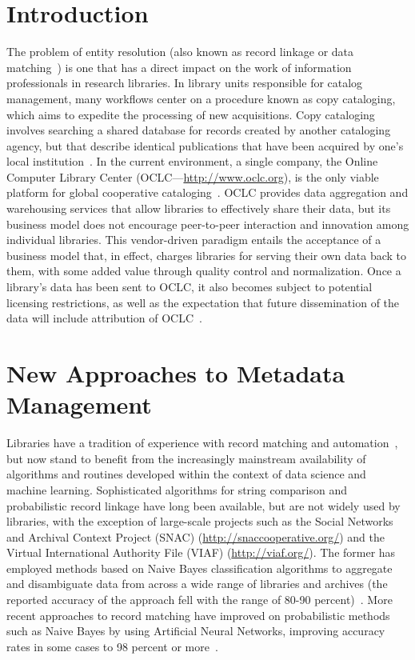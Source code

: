 
\maketitle

\section{Introduction}
The problem of entity resolution (also known as record linkage or data
matching~\cite{pC12}) is one that has a direct impact on the work of
information professionals in research libraries. In library units
responsible for catalog management, many workflows center on a procedure
known as copy cataloging, which aims to expedite the processing of new
acquisitions. Copy cataloging involves searching a shared database for
records created by another cataloging agency, but that describe identical
publications that have been acquired by one's local institution~\cite{cD17}.
In the current environment, a single company, the Online Computer Library
Center (OCLC---\url{http://www.oclc.org}), is the only viable platform for
global cooperative cataloging~\cite{aT10}. OCLC provides data aggregation
and warehousing services that allow libraries to effectively share their
data, but its business model does not encourage peer-to-peer interaction and
innovation among individual libraries. This vendor-driven paradigm entails
the acceptance of a business model that, in effect, charges libraries for
serving their own data back to them, with some added value through quality
control and normalization. Once a library's data has been sent to OCLC, it
also becomes subject to potential licensing restrictions, as well as the
expectation that future dissemination of the data will include attribution
of OCLC~\cite{oclcND, oclc10}.

\section{New Approaches to Metadata Management}
Libraries have a tradition of experience with record matching and
automation~\cite{jM92}, but now stand to benefit from the increasingly
mainstream availability of algorithms and routines developed within the
context of data science and machine learning. Sophisticated algorithms for
string comparison and probabilistic record linkage have long been
available, but are not widely used by libraries, with the exception of
large-scale projects such as the Social Networks and Archival Context
Project (SNAC) (\url{http://snaccooperative.org/}) and the Virtual
International Authority File (VIAF) (\url{http://viaf.org/}). The former has
employed methods based on Naive Bayes classification algorithms to aggregate
and disambiguate data from across a wide range of libraries and archives
(the reported accuracy of the approach fell with the range of 80-90
percent)~\cite{rL11}. More recent approaches to record matching have
improved on probabilistic methods such as Naive Bayes by using Artificial
Neural Networks, improving accuracy rates in some cases to 98 percent or
more~\cite{rG17}.

